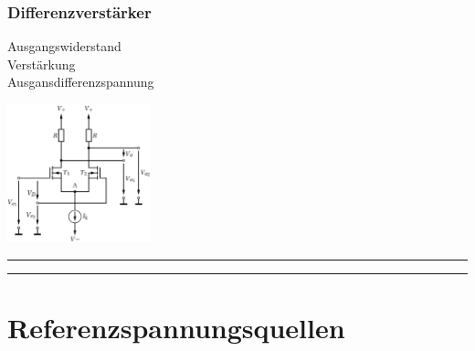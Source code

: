             \subsubsection{Differenzverst\"arker}
            \begin{minipage}[T]{14cm}
                Ausgangswiderstand
                \hspace{10.6mm}\\
                Verst\"arkung
                \hspace{23.3mm}\\
                Ausgansdifferenzspannung
                \hspace{1.7mm}
                
            \end{minipage}
            \begin{minipage}[T]{5cm}
                \includegraphics[height=4cm]{./bilder/MOSFET_Diffamp.png}
            \end{minipage}
\hrule
\hrule

	\section{Referenzspannungsquellen}

